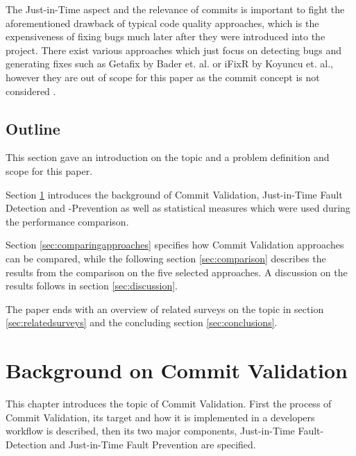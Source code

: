 The Just-in-Time aspect and the relevance of commits is important to fight the aforementioned drawback of typical code quality approaches, which is the expensiveness of fixing bugs much later after they were introduced into the project. 
There exist various approaches which just focus on detecting bugs and generating fixes such as Getafix by Bader et. al. or iFixR by Koyuncu et. al., however they are out of scope for this paper as the commit concept is not considered \cite{Bader2019,Koyuncu2019}.


\subsection{Outline}
This section gave an introduction on the topic and a problem definition and scope for this paper.

Section \ref{sec:background} introduces the background of Commit Validation, Just-in-Time Fault Detection and -Prevention as well as statistical measures which were used during the performance comparison.

Section \ref{sec:comparingapproaches} specifies how Commit Validation approaches can be compared, while the following section \ref{sec:comparison} describes the results from the comparison on the five selected approaches. A discussion on the results follows in section \ref{sec:discussion}.

The paper ends with an overview of related surveys on the topic in section \ref{sec:relatedsurveys} and the concluding section \ref{sec:conclusions}.



\section{Background on Commit Validation}
\label{sec:background}

This chapter introduces the topic of Commit Validation. First the process of Commit Validation, its target and how it is implemented in a developers workflow is described, then its two major components, Just-in-Time Fault-Detection and Just-in-Time Fault Prevention are specified. 

